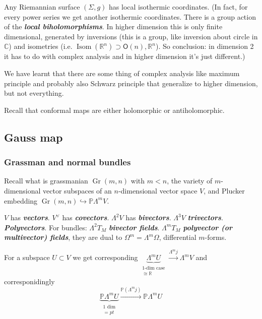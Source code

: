 \begin{claim}\leavevmode
Any Riemannian surface \((\Sigma,g)\) has local isothermic coordinates. (In fact, for every power series we get another isothermic coordinates. There is a group action of the \textit{\textbf{local biholomorphisms}}. In higher dimension this is only finite dimensional, generated by inversions (this is a group, like inversion about circle in \(\mathbb{C}\)) and isometries (i.e. \(\operatorname{Isom}(\mathbb{R}^n) \supset\mathsf{O}(n),\mathbb{R}^n\)). So conclusion: in dimension 2 it has to do with complex analysis and in higher dimension it's just different.)
\end{claim}

\begin{thing7}{We have learnt}\leavevmode
that there are some thing of complex analysis like maximum principle and probably also Schwarz principle that generalize to higher dimension, but not everything.
\end{thing7}

\begin{remark}\leavevmode
Recall that conformal maps are either holomorphic or antiholomorphic.
\end{remark}

\subsection{Gauss map}

\subsubsection{Grassman and normal bundles}

Recall what is grassmanian \(\operatorname{Gr}(m,n)\) with \(m<n\), the variety of \(m\)-dimensional vector subspaces of an \(n\)-dimensional vector space \(V\), and Plucker embedding \(\operatorname{Gr}(m,n)\hookrightarrow \mathbb{P}\Lambda^{m}V\).


\begin{defn}\leavevmode
\(V\) has \textit{\textbf{vectors}}. \(V^\vee\) has \textit{\textbf{covectors}}.  \(\Lambda^{2}V\) has \textit{\textbf{bivectors}}.  \(\Lambda^{3}V\) \textit{\textbf{trivectors}}.  \textit{\textbf{Polyvectors}}. For bundles:  \(\Lambda^{2}T_M\) \textit{\textbf{bivector fields}}.  \(\Lambda^{m}T_M\) \textit{\textbf{polyvector (or multivector) fields}}, they are dual to  \(\Omega^{m}=\Lambda^{m}\Omega\), differential \(m\)-forms.
\end{defn}
For a subspace \(U \subset V\) we get corresponding \(\underbrace{\Lambda^{m}U }_{\substack{\text{1-dim case}  \\ \cong\mathbb{R}}}\xrightarrow{\Lambda^{m}j}\Lambda^{m}V\)
and corresponidingly
\[\underbrace{\mathbb{P}\Lambda^{m}U}_{\substack{\text{1 dim}  \\ =pt}}\xrightarrow{\mathbb{P}(\Lambda^{m}j)}\mathbb{P}\Lambda^{m}U\]

